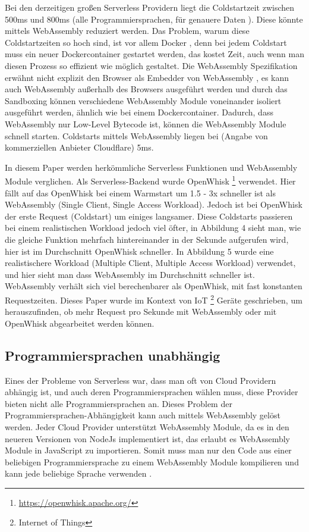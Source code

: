 Bei den derzeitigen großen Serverless Providern liegt die Coldstartzeit zwischen 500ms und 800ms \autocite[]{Shilkov} (alle Programmiersprachen, für genauere Daten \autocite[]{Wang}). Diese könnte mittels WebAssembly reduziert werden. Das Problem, warum diese Coldstartzeiten so hoch sind, ist vor allem Docker \autocite[]{Merkel}, denn bei jedem Coldstart muss ein neuer Dockercontainer gestartet werden, das kostet Zeit, auch wenn man diesen Prozess so effizient wie möglich gestaltet. Die WebAssembly Spezifikation erwähnt nicht explizit den Browser als Embedder von WebAssembly \autocite[]{Haas2017}, es kann auch WebAssembly außerhalb des Browsers ausgeführt werden und durch das Sandboxing können verschiedene WebAssembly Module voneinander isoliert ausgeführt werden, ähnlich wie bei einem Dockercontainer. Dadurch, dass WebAssembly nur Low-Level Bytecode \autocite[]{Zakai2011} ist, können die WebAssembly Module schnell starten. Coldstarts mittels WebAssembly liegen bei (Angabe von kommerziellen Anbieter Cloudflare) 5ms.

In diesem Paper \autocite[]{Hall2019} werden herkömmliche Serverless Funktionen und WebAssembly Module verglichen. Als Serverless-Backend wurde OpenWhisk \footnote{\url{https://openwhisk.apache.org/}} verwendet. Hier fällt auf das OpenWhisk bei einem Warmstart um 1.5 - 3x schneller ist als WebAssembly (Single Client, Single Access Workload). Jedoch ist bei OpenWhisk der erste Request (Coldstart) um einiges langsamer. Diese Coldstarts passieren bei einem realistischen Workload jedoch viel öfter, in Abbildung 4 sieht man, wie die gleiche Funktion mehrfach hintereinander in der Sekunde aufgerufen wird, hier ist im Durchschnitt OpenWhisk schneller. In Abbildung 5 wurde eine realistischere Workload (Multiple Client, Multiple Access Workload) verwendet, und hier sieht man dass WebAssembly im Durchschnitt schneller ist. WebAssembly verhält sich viel berechenbarer als OpenWhisk, mit fast konstanten Requestzeiten. Dieses Paper wurde im Kontext von IoT \footnote{Internet of Things} Geräte geschrieben, um herauszufinden, ob mehr Request pro Sekunde mit WebAssembly oder mit OpenWhisk abgearbeitet werden können. 



\subsection{Programmiersprachen unabhängig}

Eines der Probleme von Serverless war, dass man oft von Cloud Providern abhängig ist, und auch deren Programmiersprachen wählen muss, diese Provider bieten nicht alle Programmiersprachen an. Dieses Problem der Programmiersprachen-Abhängigkeit kann auch mittels WebAssembly gelöst werden. Jeder Cloud Provider unterstützt WebAssembly Module, da es in den neueren Versionen von NodeJs implementiert ist, das erlaubt es WebAssembly Module in JavaScript zu importieren. Somit muss man nur den Code aus einer beliebigen Programmiersprache zu einem WebAssembly Module kompilieren und kann jede beliebige Sprache verwenden \autocite[]{Vilk2014} \autocite[]{LetzGRAME2017}.

